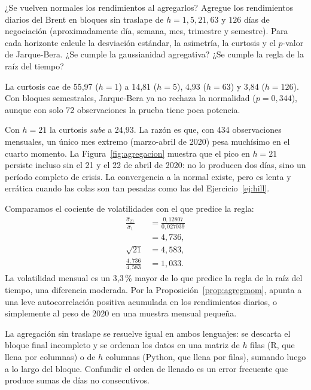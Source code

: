 \begin{ejresuelto}{¿Se vuelven normales los rendimientos al agregarlos?}\label{ej:agregacion}
\enunciado Agregue los rendimientos diarios del Brent en bloques sin traslape de $h=1,5,21,63$ y $126$
días de negociación (aproximadamente día, semana, mes, trimestre y semestre). Para cada horizonte calcule
la desviación estándar, la asimetría, la curtosis y el $p$-valor de Jarque-Bera. ¿Se cumple la
gaussianidad agregativa? ¿Se cumple la regla de la raíz del tiempo?

\solucion
{} La curtosis cae de 55,97 ($h=1$) a 14,81 ($h=5$), 4,93 ($h=63$) y
3,84 ($h=126$). Con bloques semestrales, Jarque-Bera ya no rechaza la normalidad ($p=0{,}344$), aunque
con solo 72 observaciones la prueba tiene poca potencia.

 Con $h=21$ la curtosis \emph{sube} a 24,93. La razón es que,
con 434 observaciones mensuales, un único mes extremo (marzo-abril de 2020) pesa muchísimo en el cuarto
momento. La Figura~\ref{fig:agregacion} muestra que el pico en $h=21$ persiste incluso sin el 21 y el
22 de abril de 2020: no lo producen dos días, sino un período completo de crisis. La convergencia a la
normal existe, pero es lenta y errática cuando las colas son tan pesadas como las del
Ejercicio~\ref{ej:hill}.

 Comparamos el cociente de volatilidades con el que predice la regla:
\begin{align*}
  \frac{\hat\sigma_{21}}{\hat\sigma_{1}} &= \frac{0{,}12807}{0{,}027039}\\
                                          &= 4{,}736,\\
  \sqrt{21}                               &= 4{,}583,\\
  \frac{4{,}736}{4{,}583}                 &= 1{,}033 .
\end{align*}
La volatilidad mensual es un 3,3\,\% mayor de lo que predice la regla de la raíz del tiempo, una
diferencia moderada. Por la Proposición~\ref{prop:agregmom}, apunta a una leve autocorrelación positiva
acumulada en los rendimientos diarios, o simplemente al peso de 2020 en una muestra mensual pequeña.


\RvsPy La agregación sin traslape se resuelve igual en ambos lenguajes: se descarta el bloque final
incompleto y se ordenan los datos en una matriz de $h$ filas (R, que llena por columnas) o de $h$
columnas (Python, que llena por filas), sumando luego a lo largo del bloque. Confundir el orden de
llenado es un error frecuente que produce sumas de días no consecutivos.


\end{ejresuelto}
